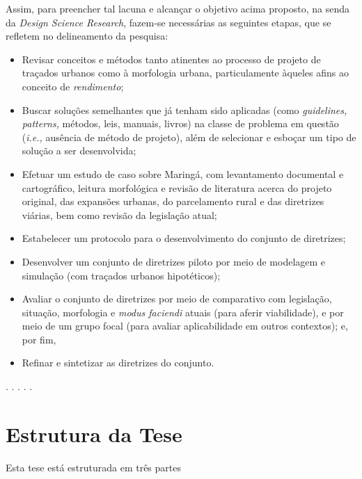 \documentclass[12pt, a4paper]{book} %
\begin{document}
        Assim, para preencher tal lacuna e alcançar o objetivo acima proposto, na senda da \textit{Design Science Research}, fazem-se necessárias as seguintes etapas, que se refletem no delineamento da pesquisa: 
            \begin{itemize}
                \item Revisar conceitos e métodos tanto atinentes ao processo de projeto de traçados urbanos como à morfologia urbana, particulamente àqueles afins ao conceito de \textit{rendimento}; 
                \item Buscar soluções semelhantes que já tenham sido aplicadas (como \textit{guidelines, patterns,} métodos, leis, manuais, livros) na classe de problema em questão (\textit{i.e.,} ausência de método de projeto), além de selecionar e esboçar um tipo de solução a ser desenvolvida;
                \item Efetuar um estudo de caso sobre Maringá, com levantamento documental e cartográfico, leitura morfológica e revisão de literatura acerca do projeto original, das expansões urbanas, do parcelamento rural e das diretrizes viárias, bem como revisão da legislação atual; %
                \item Estabelecer um protocolo para o desenvolvimento do conjunto de diretrizes; 
                \item Desenvolver um conjunto de diretrizes piloto por meio de modelagem e simulação (com traçados urbanos hipotéticos); 
                \item Avaliar o conjunto de diretrizes por meio de comparativo com legislação, situação, morfologia e \textit{modus faciendi} atuais (para aferir viabilidade), e por meio de um grupo focal (para avaliar aplicabilidade em outros contextos); e, por fim,
                \item Refinar e sintetizar as diretrizes do conjunto.
            \end{itemize}

        \begin{center}
        . . . . .
        \end{center}

            \section*{Estrutura da Tese}

            Esta tese está estruturada em três partes
\end{document}

